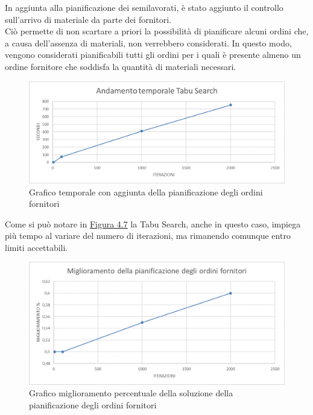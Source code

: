 In aggiunta alla pianificazione dei semilavorati, è stato aggiunto il controllo sull'arrivo di materiale da parte dei fornitori.\\Ciò permette di non scartare a priori la possibilità
di pianificare alcuni ordini che, a causa dell'assenza di materiali, non verrebbero considerati. In questo modo, vengono considerati pianificabili tutti gli ordini per i quali
è presente almeno un ordine fornitore che soddisfa la quantità di materiali necessari. 

\begin{figure}[H]
	\includegraphics[width=13cm]{immagini/graficofo2.png}
	\centering
    \caption{Grafico temporale con aggiunta della pianificazione degli ordini fornitori}
    \label{4.7}
\end{figure}

Come si può notare in \hyperref[4.7]{Figura 4.7} la Tabu Search, anche in questo caso, impiega più tempo al variare del numero di iterazioni, ma rimanendo comunque entro limiti accettabili.

\begin{figure}[H]
	\includegraphics[width=13cm]{immagini/graficofo3.png}
	\centering
    \caption{Grafico miglioramento percentuale della soluzione della pianificazione degli ordini fornitori}
    \label{4.8}
\end{figure}

